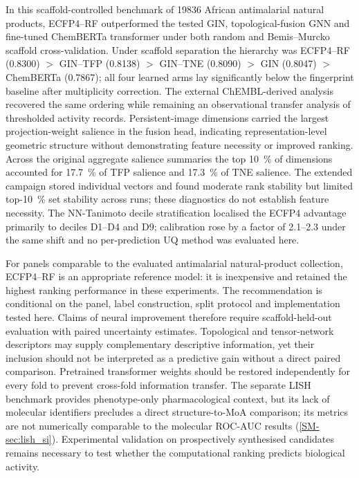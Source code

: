 \documentclass[11pt,a4paper]{article}
\begin{document}
In this scaffold-controlled benchmark of \num{19836} African antimalarial natural products, ECFP4--RF outperformed the tested GIN, topological-fusion GNN and fine-tuned ChemBERTa transformer under both random and Bemis--Murcko scaffold cross-validation. Under scaffold separation the hierarchy was ECFP4--RF (\num{0.8300}) $>$ GIN--TFP (\num{0.8138}) $>$ GIN--TNE (\num{0.8090}) $>$ GIN (\num{0.8047}) $>$ ChemBERTa (\num{0.7867}); all four learned arms lay significantly below the fingerprint baseline after multiplicity correction. The external ChEMBL-derived analysis recovered the same ordering while remaining an observational transfer analysis of thresholded activity records. Persistent-image dimensions carried the largest projection-weight salience in the fusion head, indicating representation-level geometric structure without demonstrating feature necessity or improved ranking. Across the original aggregate salience summaries the top \qty{10}{\percent} of dimensions accounted for \qty{17.7}{\percent} of TFP salience and \qty{17.3}{\percent} of TNE salience. The extended campaign stored individual vectors and found moderate rank stability but limited top-\qty{10}{\percent} set stability across runs; these diagnostics do not establish feature necessity. The NN-Tanimoto decile stratification localised the ECFP4 advantage primarily to deciles D\num{1}--D\num{4} and D\num{9}; calibration rose by a factor of \numrange{2.1}{2.3} under the same shift and no per-prediction UQ method was evaluated here.

For panels comparable to the evaluated antimalarial natural-product collection, ECFP4--RF is an appropriate reference model: it is inexpensive and retained the highest ranking performance in these experiments. The recommendation is conditional on the panel, label construction, split protocol and implementation tested here. Claims of neural improvement therefore require scaffold-held-out evaluation with paired uncertainty estimates. Topological and tensor-network descriptors may supply complementary descriptive information, yet their inclusion should not be interpreted as a predictive gain without a direct paired comparison. Pretrained transformer weights should be restored independently for every fold to prevent cross-fold information transfer. The separate LISH benchmark provides phenotype-only pharmacological context, but its lack of molecular identifiers precludes a direct structure-to-MoA comparison; its metrics are not numerically comparable to the molecular ROC-AUC results (\cref{SM-sec:lish_si}). Experimental validation on prospectively synthesised candidates remains necessary to test whether the computational ranking predicts biological activity.
\end{document}
